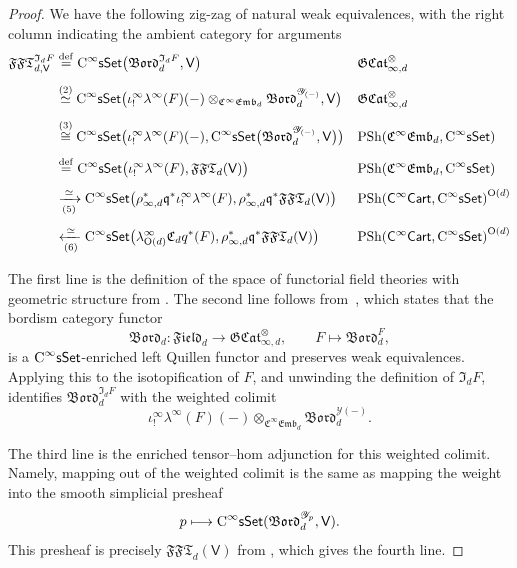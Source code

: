\documentclass{amsart}
\newcommand{\cat}[1]{\mathsf{#1}}
\newcommand{\sset}{\cat{sSet}}
\newcommand{\we}{\simeq}
\newcommand{\CsSet}{\textnormal{C}^{\infty}\sset}
\newcommand{\field}[1]{\mathfrak{Field}_{#1}}
\newcommand{\Cart}{\cat{C}^{\infty}\cat{Cart}}
\newcommand{\femb}[1]{\mathfrak{C}^{\infty}\mathfrak{Emb}_{#1}}
\newcommand{\Bord}{\mathfrak{Bord}}
\newcommand{\FFT}{\mathfrak{FFT}}
\newcommand{\GCat}{\mathfrak{G}\mathfrak{Cat}}
\newcommand{\psh}{\mathrm{PSh}}
\newcommand{\Cc}{\mathfrak{C}}
\newcommand{\Yo}{\mathscr{Y}}
\theoremstyle{definition}
\numberwithin{equation}{subsection}
\numberwithin{subsubsection}{subsection}
\begin{document}
\begin{proof}
  We have the following zig-zag of natural weak equivalences, with the right
  column indicating the ambient category for arguments
  \begin{align*}
    \FFT_{d,\cat{V}}^{\mathfrak{I}_{d}F}
    &\stackrel{\mathrm{def}}{=}
    \CsSet\bigl(\Bord_{d}^{\mathfrak{I}_{d}F},\cat{V}\bigr)
    &&\text{\(\GCat_{\infty,d}^{\otimes}\)} \\[1ex]
    &\stackrel{(2)}{\we}
    \CsSet\bigl(\iota_{!}^{\infty}\lambda^{\infty}(F)(-)
    \otimes_{\femb{d}}\Bord_{d}^{\Yo_{(-)}},\cat{V}\bigr)
    &&\text{\(\GCat_{\infty,d}^{\otimes}\)} \\[1ex]
    &\stackrel{(3)}{\cong}
    \CsSet\bigl(\iota_{!}^{\infty}\lambda^{\infty}(F)(-),
    \CsSet\bigl(\Bord_{d}^{\Yo_{(-)}},\cat{V}\bigr)\bigr)
    &&\text{\(\psh(\femb{d},\CsSet)\)} \\[1ex]
    &\stackrel{\mathrm{def}}{=}
    \CsSet\bigl(\iota_{!}^{\infty}\lambda^{\infty}(F),
    \FFT_{d}(\cat{V})\bigr)
    &&\text{\(\psh(\femb{d},\CsSet)\)} \\[1ex]
    &\xrightarrow[(5)]{\we}
    \CsSet\bigl(
      \rho^{*}_{\infty,d}\mathfrak{q}^{*}
      \iota_{!}^{\infty}\lambda^{\infty}(F),
    \rho^{*}_{\infty,d}\mathfrak{q}^{*}\FFT_{d}(\cat{V})\bigr)
    &&\text{\({\psh(\Cart,\CsSet)}^{\mathrm{O}(d)}\)} \\[1ex]
    &\xleftarrow[(6)]{\we}
    \CsSet\bigl(
      \lambda^{\infty}_{\mathrm{O}(d)}\Cc_{d}q^{*}(F),
    \rho^{*}_{\infty,d}\mathfrak{q}^{*}\FFT_{d}(\cat{V})\bigr)
    &&\text{\({\psh(\Cart,\CsSet)}^{\mathrm{O}(d)}\)}
  \end{align*}

  The first line is the
  definition of the space of functorial field
  theories with geometric structure from
  . The second line follows
  from~\cite[Theorem~6.1.3]{GP26},
  which states that the bordism category functor
  \[
    \Bord_{d}:\field{d}\to \GCat_{\infty,d}^{\otimes},
    \qquad
    F\mapsto \Bord_{d}^{F},
  \]
  is a \( \CsSet \)-enriched left Quillen functor and preserves weak
  equivalences. Applying this to the isotopification of \( F \), and
  unwinding the definition of \( \mathfrak{I}_{d}F \), identifies
  \( \Bord^{\mathfrak{I}_{d}F}_{d} \) with the weighted colimit
  \[
    \iota^{\infty}_{!}\lambda^{\infty}(F)(-)
    \otimes_{\femb{d}}
    \Bord^{\Yo(-)}_{d}.
  \]

  The third line is the enriched tensor--hom adjunction for
  this weighted colimit. Namely, mapping out of the weighted colimit is the
  same as mapping the weight into the smooth simplicial presheaf
  \[
    p\longmapsto
    \CsSet(\Bord^{\Yo_{p}}_{d},\cat{V}).
  \]
  This presheaf is precisely
  \( \FFT_{d}(\cat{V}) \) from , which
  gives the fourth line.


\end{proof}
\end{document}
